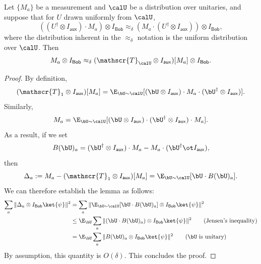 \documentclass[11pt]{article}
\newcommand{\twirl}{\mathscr{T}}
\newcommand{\reg}[1]{{\mathsf{#1}}}
\begin{document}
  
  \begin{lemma}\label{lem:commute-to-twirlU}
    Let $\{M_{a}\}$ be a measurement and $\calU$ be a distribution over
    unitaries,
    and suppose that for $U$ drawn uniformly from $\calU$,
    \begin{equation*}
      ((U^\dagger \otimes I_{\reg{aux}}) \cdot M_{a}) \otimes I_{\reg{Bob}}
      \approx_{\delta} (M_{a} \cdot (U^\dagger \otimes I_{\reg{aux}})) \otimes I_{\reg{Bob}},
    \end{equation*}
    where the distribution inherent in the $\approx_{\delta}$ notation
    is the uniform distribution over $\calU$.
    Then
    \begin{equation*}
      M_{a} \otimes I_{\reg{Bob}} \approx_{\delta} (\twirl_{\calU} \otimes I_{\reg{aux}})[M_{a}] \otimes I_{\reg{Bob}}.
    \end{equation*}
  \end{lemma}
  
  \begin{proof}
    By definition,
\begin{equation*}
(\twirl_1 \otimes I_{\reg{aux}})[M_{a}]
= \E_{\bU \sim \calU} [(\bU \otimes I_{\reg{aux}}) \cdot M_a \cdot (\bU^\dagger \otimes I_{\reg{aux}})].
\end{equation*}
Similarly,
\begin{equation*}
M_{a}
= \E_{\bU \sim \calU} [( \bU \otimes I_{\reg{aux}}) \cdot
(\bU^\dagger \otimes I_{\reg{aux}})  \cdot M_a].
\end{equation*}
As a result, if we set
\begin{equation*}
B(\bU)_a = (\bU^\dagger \otimes I_{\reg{aux}}) \cdot M_a - M_a \cdot (\bU^\dagger \ot I_{\reg{aux}}),
\end{equation*}
then
\begin{equation*}
\Delta_a:=
M_a - (\twirl_1 \otimes I_{\reg{aux}})[M_a]
= \E_{\bU \sim \calU} [\bU \cdot B(\bU)_a ].
\end{equation*}
We can therefore establish the lemma as follows:
\begin{align*}
\sum_a \Vert \Delta_a \otimes I_{\reg{Bob}} \ket{\psi} \Vert^2
& = \sum_a \Vert \E_{\bU \sim \calU} [ \bU \cdot B(\bU)_a ] \otimes I_{\reg{Bob}} \ket{\psi} \Vert^2\\
& \leq \E_{\bU} \sum_a \Vert (\bU \cdot B(\bU)_a ) \otimes I_{\reg{Bob}} \ket{\psi} \Vert^2\tag{Jensen's inequality}\\
& = \E_{\bU} \sum_a \Vert B(\bU)_a \otimes I_{\reg{Bob}} \ket{\psi} \Vert^2 \tag{$\bU$ is unitary}
\end{align*}
By assumption, this quantity is $O(\delta)$. This concludes the proof.
\end{proof}
\end{document}
